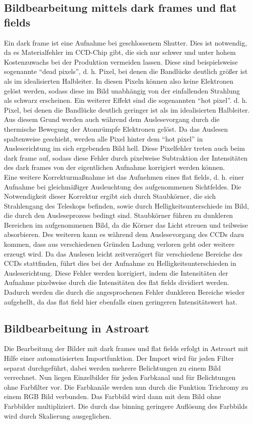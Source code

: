 \subsection{Bildbearbeitung mittels dark frames und flat fields}
Ein dark frame ist eine Aufnahme bei geschlossenem Shutter. Dies ist notwendig, da es Materialfehler im CCD-Chip gibt, die sich nur schwer und unter hohem Kostenzuwachs bei der Produktion vermeiden lassen. Diese sind beispielsweise sogenannte \enquote{dead pixels}, d. h. Pixel, bei denen die Bandlücke deutlich größer ist als im idealisierten Halbleiter. In diesen Pixeln können also keine Elektronen gelöst werden, sodass diese im Bild unabhängig von der einfallenden Strahlung als schwarz erscheinen.
Ein weiterer Effekt sind die sogenannten \enquote{hot pixel}. d. h. Pixel, bei denen die Bandlücke deutlich geringer ist als im idealisierten Halbleiter. Aus diesem Grund  werden auch während dem Auslesevorgang durch die thermische Bewegung der Atomrümpfe Elektronen gelöst. Da das Auslesen spaltenweise geschieht, werden alle Pixel hinter dem \enquote{hot pixel} in Ausleserichtung im sich ergebenden Bild hell. Diese Pixelfehler treten auch beim dark frame auf, sodass diese Fehler durch pixelweise Subtraktion der Intensitäten des dark frames von der eigentlichen Aufnahme korrigiert werden können. \\
Eine weitere Korrekturmaßnahme ist das Aufnehmen eines flat fields, d. h. einer Aufnahme bei gleichmäßiger Ausleuchtung des aufgenommenen Sichtfeldes. Die Notwendigkeit dieser Korrektur ergibt sich durch Staubkörner, die sich Strahlengang des Teleskops befinden, sowie durch Helligkeitsunterschiede im Bild, die durch den Ausleseprozess bedingt sind. Staubkörner führen zu dunkleren Bereichen im aufgenommenen Bild, da die Körner das Licht streuen und teilweise absorbieren. Des weiteren kann es während dem Auslesevorgang des CCDs dazu kommen, dass aus verschiedenen Gründen Ladung verloren geht oder weitere erzeugt wird. Da das Auslesen leicht zeitverzögert für verschiedene Bereiche des CCDs stattfinden, führt dies bei der Aufnahme zu Helligkeitsunterschieden in Ausleserichtung. Diese Fehler werden korrigiert, indem die Intensitäten der Aufnahme pixelweise durch die Intensitäten des flat fields dividiert werden. Dadurch werden die durch die angesprochenen Fehler dunkleren Bereiche wieder aufgehellt, da das flat field hier ebenfalls einen geringeren Intensitätswert hat.

\subsection{Bildbearbeitung in Astroart}
Die Bearbeitung der Bilder mit dark frames und flat fields erfolgt in Astroart mit Hilfe einer automatisierten Importfunktion. Der Import wird für jeden Filter separat durchgeführt, dabei werden mehrere Belichtungen zu einem Bild verrechnet. Nun liegen Einzelbilder für jeden Farbkanal und für Belichtungen ohne Farbfilter vor. Die Farbkanäle werden nun durch die Funktion Trichromy zu einem RGB Bild verbunden. Das Farbbild wird dann mit dem Bild ohne Farbbilder multipliziert. Die durch das binning geringere Auflösung des Farbbilds wird durch Skalierung ausgeglichen.

